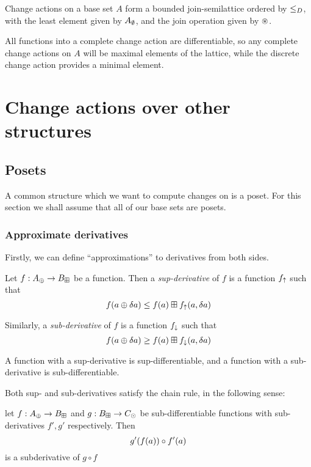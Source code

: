 \begin{thm}
  Change actions on a base set $A$ form a bounded join-semilattice 
  ordered by $\leq_D$, with the least element given by
  $A_\emptyset$, and the join operation given by $\circledast$.
\end{thm}

All functions into a complete change action are differentiable, so any
complete change actions on $A$ will be maximal elements of the lattice, while
the discrete change action provides a minimal element.

\section{Change actions over other structures}
\label{sec:moreStructures}

\subsection{Posets}

A common structure which we want to compute changes on is a poset. For this
section we shall assume that all of our base sets are posets.

\subsubsection{Approximate derivatives}

Firstly, we can define ``approximations'' to derivatives from both sides.

\begin{defn}
  Let $f: A_\oplus \rightarrow B_\boxplus$ be a function. Then a \textit{sup-derivative}
  of $f$ is a function $f_\uparrow$ such that
  $$f(a \oplus \delta a) \leq f(a) \boxplus f_\uparrow(a, \delta a)$$
  
  Similarly, a \textit{sub-derivative} of $f$ is a function $f_\downarrow$ such that 
  $$f(a \oplus \delta a) \geq f(a) \boxplus f_\downarrow(a, \delta a)$$

  A function with a sup-derivative is sup-differentiable, and a function with a
  sub-derivative is sub-differentiable.
\end{defn}

Both sup- and sub-derivatives satisfy the chain rule, in the following sense: 
\begin{prop}
  let $f : A_\oplus \rightarrow B_\boxplus$ and $g : B_\boxplus \rightarrow C_\odot$ be
  sub-differentiable functions with sub-derivatives $f', g'$ respectively. Then
  $$g'(f(a)) \circ f'(a)$$ is a subderivative of $g \circ f$
\end{prop}

